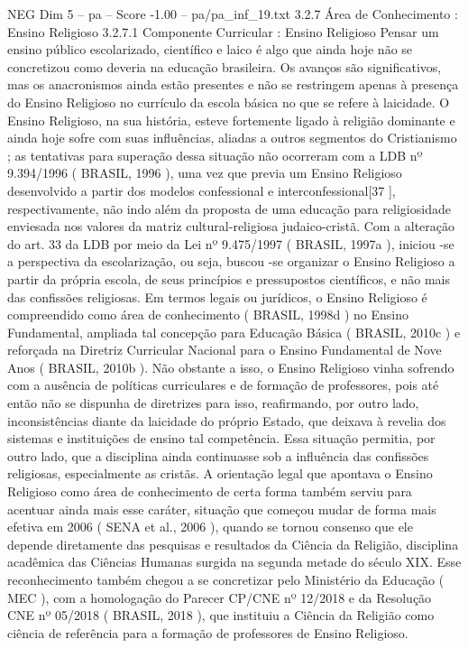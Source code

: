 \begin{textsample}{NEG Dim 5 – pa – Score -1.00 – pa/pa\_inf\_19.txt}  \label{ex:f5_neg_045}
3.2.7 Área de Conhecimento : Ensino Religioso 3.2.7.1 Componente Curricular : Ensino Religioso Pensar um ensino público escolarizado, científico e laico é algo que ainda hoje não se concretizou como deveria na educação brasileira.
Os avanços são significativos, mas os anacronismos ainda estão presentes e não se restringem apenas à presença do Ensino Religioso no currículo da escola básica no que se refere à laicidade.
O Ensino Religioso, na sua história, esteve fortemente ligado à religião dominante e ainda hoje sofre com suas influências, aliadas a outros segmentos do Cristianismo ; as tentativas para superação dessa situação não ocorreram com a LDB nº 9.394/1996 ( BRASIL, 1996 ), uma vez que previa um Ensino Religioso desenvolvido a partir dos modelos confessional e interconfessional[37 ], respectivamente, não indo além da proposta de uma educação para religiosidade enviesada nos valores da matriz cultural-religiosa judaico-cristã.
Com a alteração do art. 33 da LDB por meio da Lei nº 9.475/1997 ( BRASIL, 1997a ), iniciou -se a perspectiva da escolarização, ou seja, buscou -se organizar o Ensino Religioso a partir da própria escola, de seus princípios e pressupostos científicos, e não mais das confissões religiosas.
Em termos legais ou jurídicos, o Ensino Religioso é compreendido como área de conhecimento ( BRASIL, 1998d ) no Ensino Fundamental, ampliada tal concepção para Educação Básica ( BRASIL, 2010c ) e reforçada na Diretriz Curricular Nacional para o Ensino Fundamental de Nove Anos ( BRASIL, 2010b ).
Não obstante a isso, o Ensino Religioso vinha sofrendo com a ausência de políticas curriculares e de formação de professores, pois até então não se dispunha de diretrizes para isso, reafirmando, por outro lado, inconsistências diante da laicidade do próprio Estado, que deixava à revelia dos sistemas e instituições de ensino tal competência.
Essa situação permitia, por outro lado, que a disciplina ainda continuasse sob a influência das confissões religiosas, especialmente as cristãs.
A orientação legal que apontava o Ensino Religioso como área de conhecimento de certa forma também serviu para acentuar ainda mais esse caráter, situação que começou mudar de forma mais efetiva em 2006 ( SENA et al., 2006 ), quando se tornou consenso que ele depende diretamente das pesquisas e resultados da Ciência da Religião, disciplina acadêmica das Ciências Humanas surgida na segunda metade do século XIX.
Esse reconhecimento também chegou a se concretizar pelo Ministério da Educação ( MEC ), com a homologação do Parecer CP/CNE nº 12/2018 e da Resolução CNE nº 05/2018 ( BRASIL, 2018 ), que instituiu a Ciência da Religião como ciência de referência para a formação de professores de Ensino Religioso.

\end{textsample}
